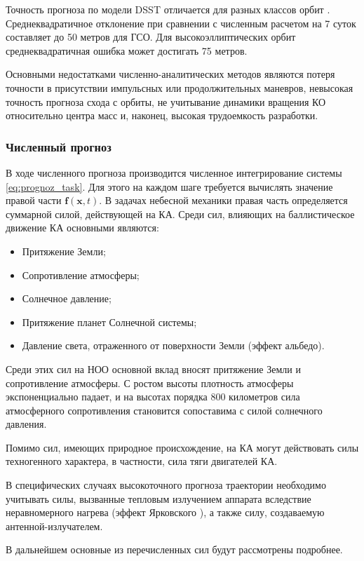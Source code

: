 Точность прогноза по модели DSST отличается для разных классов орбит \cite{setty2016}.
Среднеквадратичное отклонение при сравнении с численным расчетом на 7 суток составляет до 50 метров для ГСО.
Для высокоэллиптических орбит среднеквадратичная ошибка может достигать 75 метров. 

Основными недостатками численно-аналитических методов являются 
потеря точности в присутствии импульсных или продолжительных маневров,
невысокая точность прогноза схода с орбиты,
не учитывание динамики вращения КО относительно центра масс и, наконец,
высокая трудоемкость разработки.

\subsubsection{Численный прогноз}

В ходе численного прогноза производится численное интегрирование системы \eqref{eq:prognoz_task}.
Для этого на каждом шаге требуется вычислять значение правой части $\mathbf{f}(\mathbf{x}, t)$. 
В задачах небесной механики правая часть определяется суммарной силой, действующей на КА.
Среди сил, влияющих на баллистическое движение КА основными являются:
\begin{itemize}
    \item Притяжение Земли;
    \item Сопротивление атмосферы;
    \item Солнечное давление;
    \item Притяжение планет Солнечной системы;
    \item Давление света, отраженного от поверхности Земли (эффект альбедо).
\end{itemize}

Среди этих сил на НОО основной вклад вносят притяжение Земли и сопротивление атмосферы.
С ростом высоты плотность атмосферы экспоненциально падает, и на высотах порядка 800 километров
сила атмосферного сопротивления становится сопоставима с силой солнечного давления.

Помимо сил, имеющих природное происхождение, на КА могут действовать силы техногенного характера, 
в частности, сила тяги двигателей КА.

В специфических случаях высокоточного прогноза траектории необходимо учитывать
силы, вызванные тепловым излучением аппарата вследствие неравномерного нагрева (эффект Ярковского \cite{farinella1996}), 
а также силу, создаваемую антенной-излучателем.

В дальнейшем основные из перечисленных сил будут рассмотрены подробнее.

